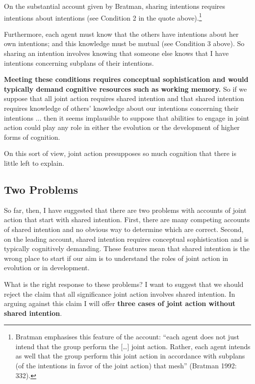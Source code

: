 \documentclass[14pt,a4paper]{extarticle}
\begin{document}
On the substantial account given by Bratman, sharing intentions requires intentions about intentions (see Condition 2 in the quote above).\footnote{
Bratman emphasises this feature of the account: “each agent does not just intend that the group perform the […] joint action. Rather, each agent intends as well that the group perform this joint action in accordance with subplans (of the intentions in favor of the joint action) that mesh” (Bratman 1992: 332).
}

Furthermore, each agent must know that the others have intentions about her own intentions; and this knowledge must be mutual (see Condition 3 above).  So sharing an intention involves knowing that someone else knows that I have intentions concerning subplans of their intentions.  


\textbf{Meeting these conditions requires conceptual sophistication and would typically demand cognitive resources such as working memory.}  
So if we suppose that all joint action requires shared intention and that shared intention requires knowledge of others' knowledge about our intentions concerning their intentions ... then it seems implausible to suppose that abilities to engage in joint action could play any role in either the evolution or the development of higher forms of cognition.

On this sort of view, joint action presupposes so much cognition that there is little left to explain.





\subsection{Two Problems}
So far, then, I have suggested that there are two problems with accounts of joint action that start with shared intention.
First, there are many competing accounts of shared intention and no obvious way to determine which are correct.
Second, on the leading account, shared intention requires conceptual sophistication and is typically cognitively demanding.
These features mean that shared intention is the wrong place to start if our aim is to understand the roles of joint action in evolution or in development.

What is the right response to these problems?
I want to suggest that we should reject the claim that all significance joint action involves shared intention.  
In arguing against this claim I will offer \textbf{three cases of joint action without shared intention}.
\end{document}
